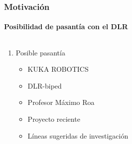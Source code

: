 \mode*
\begin{frame}[label=pasantia]
  \pasantiaTime
  \frametitle{Motivaci\'on}
  \framesubtitle{Posibilidad de pasant\'ia con el DLR}
  \quad\hspace{-0.8cm}\vspace{-0.5cm}
  \begin{columns}[T,totalwidth=0.97\textwidth]
    \small
    \begin{column}{0.55\textwidth}
      \begin{enumerate}
      \item<1-|alert@1|uncover@1-6> Posible pasant\'ia
        \begin{itemize}\scriptsize
        \item<2-|alert@2|uncover@2> KUKA ROBOTICS
        \item<3-|alert@3|uncover@3> DLR-biped
        \item<4-|alert@4|uncover@4> Profesor M\'aximo Roa
        \item<5-|alert@5|uncover@5> Proyecto reciente
        \item<6-|alert@6|uncover@6> L\'ineas sugeridas de investigaci\'on
        \end{itemize}
      \end{enumerate}
    \end{column}
    \begin{column}{0.4\textwidth}
      \parbox[c][7cm][c]{4.0cm}{
      }
    \end{column}
  \end{columns}
\end{frame}
